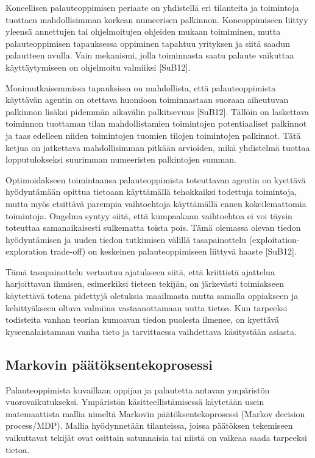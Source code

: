 \documentclass[finnish]{tktltiki2}
\theoremstyle{definition}
\theoremstyle{remark}
\begin{document}
Koneellisen palauteoppimisen periaate on yhdistellä eri tilanteita ja toimintoja tuottaen mahdollisimman korkean numeerisen palkinnon. Koneoppimiseen liittyy yleensä annettujen tai ohjelmoitujen ohjeiden mukaan toimiminen, mutta palauteoppimisen tapauksessa oppiminen tapahtuu yrityksen ja siitä saadun palautteen avulla. Vain mekanismi, jolla toiminnasta saatu palaute vaikuttaa käyttäytymiseen on ohjelmoitu valmiiksi [SuB12]. 
 
Monimutkaisemmissa tapauksissa on mahdollista, että palauteoppimista käyttävän agentin on otettava huomioon toiminnastaan suoraan aiheutuvan palkinnon lisäksi pidemmän aikavälin palkitsevuus [SuB12]. Tällöin on laskettava toiminnon tuottaman tilan mahdollistamien toimintojen potentiaaliset palkinnot ja taas edelleen niiden toimintojen tuomien tilojen toimintojen palkinnot. Tätä ketjua on jatkettava mahdollisimman pitkään arvioiden, mikä yhdistelmä tuottaa lopputulokseksi suurimman numeeristen palkintojen summan. 
 
Optimoidakseen toimintaansa palauteoppimista toteuttavan agentin on kyettävä hyödyntämään opittua tietoaan käyttämällä tehokkaiksi todettuja toimintoja, mutta myös etsittävä parempia vaihtoehtoja käyttämällä ennen kokeilemattomia toimintoja. Ongelma syntyy siitä, että kumpaakaan vaihtoehtoa ei voi täysin toteuttaa samanaikaisesti sulkematta toista pois. Tämä olemassa olevan tiedon hyödyntämisen ja uuden tiedon tutkimisen välillä tasapainottelu (exploitation-exploration trade-off) on keskeinen palauteoppimiseen liittyvä haaste [SuB12].  
 
Tämä tasapainottelu vertautuu ajatukseen siitä, että kriittistä ajattelua harjoittavan ihmisen, esimerkiksi tieteen tekijän, on järkevästi toimiakseen käytettävä totena pidettyjä oletuksia maailmasta mutta samalla oppiakseen ja kehittyäkseen oltava valmiina vastaanottamaan uutta tietoa. Kun tarpeeksi todisteita vanhan teorian kumoavan tiedon puolesta ilmenee, on kyettävä kyseenalaistamaan vanha tieto ja tarvittaessa vaihdettava käsitystään asiasta. 

\subsection{Markovin päätöksentekoprosessi}

Palauteoppimista kuvaillaan oppijan ja palautetta antavan ympäristön vuorovaikutukseksi. Ympäristön käsitteellistämisessä käytetään usein matemaattista mallia nimeltä Markovin päätöksentekoprosessi (Markov decision process/MDP). Mallia hyödynnetään tilanteissa, joissa päätöksen tekemiseen vaikuttavat tekijät ovat osittain satunnaisia tai niistä on vaikeaa saada tarpeeksi tietoa. 
 
\end{document}
